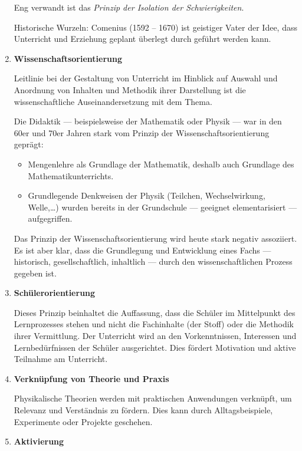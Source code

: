 \begin{enumerate}
	
	Eng verwandt ist das {\it Prinzip
	der Isolation der Schwierigkeiten}.
	
	Historische Wurzeln: Comenius (1592 -- 1670) ist
	geistiger Vater der Idee, dass Unterricht und Erziehung
	geplant \"{u}berlegt durch gef\"{u}hrt werden kann.
	
	\item{\textbf{Wissenschaftsorientierung}}
	
	Leitlinie bei der Gestaltung von Unterricht im Hinblick auf
	Auswahl und Anordnung von Inhalten und Methodik ihrer Darstellung
	ist die wissenschaftliche Auseinandersetzung mit dem Thema.
	
	\mip
	Die Didaktik --- beispielsweise der Mathematik oder Physik ---
	war in den 60er und 70er Jahren stark vom Prinzip der
	Wissenschaftsorientierung gepr\"{a}gt:
	\begin{itemize}
		\item Mengenlehre als Grundlage der Mathematik, deshalb auch
		Grundlage des Mathematikunterrichts.
		\item Grundlegende Denkweisen der Physik
		(Teilchen, Wechselwirkung, Welle,\dots) wurden bereits in der
		Grundschule --- geeignet elementarisiert --- aufgegriffen.
	\end{itemize}
	
	Das Prinzip der Wissenschaftsorientierung wird heute stark
	negativ assoziiert.
	Es ist aber klar, dass die Grundlegung und Entwicklung eines
	Fachs --- historisch, gesellschaftlich, inhaltlich ---
	durch den wissenschaftlichen Prozess gegeben ist.
	
	\item{\textbf{Sch\"{u}lerorientierung}}
	
	Dieses Prinzip beinhaltet die Auffassung, dass die
	Sch\"{u}ler im Mittelpunkt des Lernprozesses stehen
	und nicht die Fachinhalte (der Stoff) oder die Methodik ihrer
	Vermittlung.  Der Unterricht wird an den Vorkenntnissen, Interessen und Lernbed\"{u}rfnissen der Sch\"{u}ler ausgerichtet. Dies f\"{o}rdert Motivation und aktive Teilnahme am Unterricht.
	
	\item{\textbf{Verkn\"{u}pfung von Theorie und Praxis}}
	
	Physikalische Theorien werden mit praktischen Anwendungen verkn\"{u}pft, um Relevanz und Verst\"{a}ndnis zu f\"{o}rdern. Dies kann durch Alltagsbeispiele, Experimente oder Projekte geschehen.
	
	\item{\textbf{Aktivierung}}
	

\end{enumerate}
